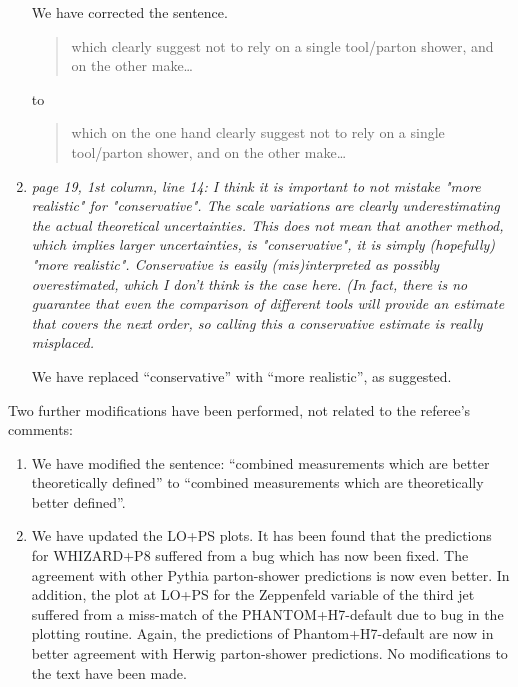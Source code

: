 \documentclass{report}
\begin{document}
\begin{enumerate}
We have corrected the sentence.
\begin{quote}
which clearly suggest not to rely on a single tool/parton shower, and on the other make\ldots
\end{quote}
to
\begin{quote}
which on the one hand clearly suggest not to rely on a single tool/parton shower, and on the other make\ldots
\end{quote}
    
\item \emph{page 19, 1st column, line 14:
I think it is important to not mistake "more realistic" for "conservative". The
scale variations are clearly underestimating the actual theoretical uncertainties.
This does not mean that another method, which implies larger uncertainties, is "conservative", it is simply (hopefully) "more realistic".
Conservative is easily (mis)interpreted as possibly overestimated, which I don't think is the case here.
(In fact, there is no guarantee that even the comparison of different tools will provide an estimate that covers the next order, so calling this a conservative estimate is really misplaced.}

We have replaced ``conservative'' with ``more realistic'', as suggested.

\end{enumerate}
\vspace{1cm}
Two further modifications have been performed, not related to the referee's comments:
\begin{enumerate}
\item We have modified the sentence:
``combined measurements which are better theoretically defined'' to ``combined measurements which are theoretically better defined''.

\item We have updated the LO+PS plots.
It has been found that the predictions for WHIZARD+P8 suffered from a bug which has now been fixed.
The agreement with other Pythia parton-shower predictions is now even better.
In addition, the plot at LO+PS for the Zeppenfeld variable of the third jet suffered from a miss-match of the PHANTOM+H7-default due to bug in the plotting routine.
Again, the predictions of Phantom+H7-default are now in better agreement with Herwig parton-shower predictions.
No modifications to the text have been made.

\end{enumerate}
\end{document}
